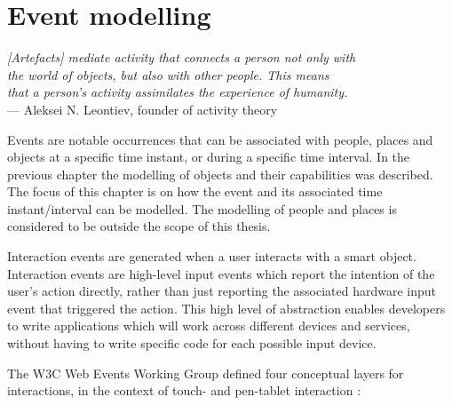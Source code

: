 \chapter{Event modelling}
\label{EventModelling}

\begin{flushright}{\slshape    
[Artefacts] mediate activity that connects a person not only with \\
 the world of objects, but also with other people. This means \\
that a person's activity assimilates the experience of humanity.} \\ \medskip
    ---  Aleksei N. Leontiev, founder of activity theory
\end{flushright}


Events are notable occurrences that can be associated with people, places and objects at a specific time instant, or during a specific time interval. In the previous chapter the modelling of objects and their capabilities was described. The focus of this chapter is on how the event and its associated time instant/interval can be modelled. The modelling of people and places is considered to be outside the scope of this thesis.


Interaction events are generated when a user interacts with a smart object. Interaction events are high-level input events which report the intention of the user's action directly, rather than just reporting the associated hardware input event that triggered the action. This high level of abstraction enables developers to write applications which will work across different devices and services, without having to write specific code for each possible input device. 

The W3C Web Events Working Group defined four conceptual layers for interactions, in the context of touch- and pen-tablet interaction \cite{w3cevents}:

